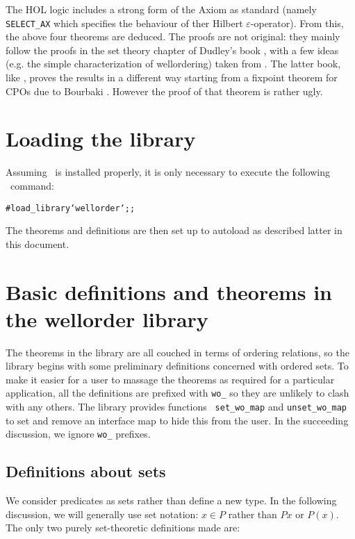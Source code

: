 The HOL logic includes a strong form of the Axiom as standard (namely
{\tt SELECT\_AX} which specifies the behaviour of ther Hilbert
$\varepsilon$-operator). From this, the above four theorems are deduced.
The proofs are not original: they mainly follow the proofs in the set theory
chapter of Dudley's book \cite{dudley}, with a few ideas (e.g. the simple
characterization of wellordering) taken from \cite{stoll}. The latter book,
like \cite{DP}, proves the results in a different way starting from a fixpoint
theorem for CPOs due to Bourbaki \cite{bourbaki}. However the proof of that
theorem is rather ugly.

\section{Loading the library}

Assuming \HOL\ is installed properly, it is only necessary to execute the
following \ML\ command:

\begin{session}\begin{alltt}
#load_library `wellorder`;;
\end{alltt}\end{session}

The theorems and definitions are then set up to autoload as described latter in
this document.

\section{Basic definitions and theorems in the wellorder library}

The theorems in the library are all couched in terms of ordering relations, so
the library begins with some preliminary definitions concerned with ordered
sets. To make it easier for a user to massage the theorems as required for a
particular application, all the definitions are prefixed with {\tt wo\_} so
they are unlikely to clash with any others. The library provides functions {\tt
set\_wo\_map} and {\tt unset\_wo\_map} to set and remove an interface map to
hide this from the user. In the succeeding discussion, we ignore {\tt wo\_}
prefixes.

\subsection{Definitions about sets}

We consider predicates as sets rather than define a new type. In the following
discussion, we will generally use set notation: $x \in P$ rather than
$P x$ or $P(x)$. The only two purely set-theoretic definitions made are:

